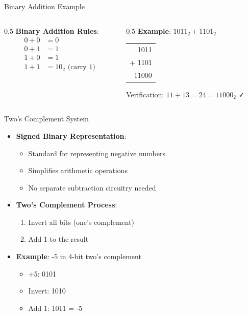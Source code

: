 \documentclass[aspectratio=169,11pt]{beamer}
\newcommand{\concept}[1]{\textbf{\color{accentcolor}#1}}
\begin{document}
\begin{frame}{Binary Addition Example}
\begin{columns}
\begin{column}{0.5\textwidth}
\concept{Binary Addition Rules}:
\begin{align}
0 + 0 &= 0\\
0 + 1 &= 1\\
1 + 0 &= 1\\
1 + 1 &= 10_2 \text{ (carry 1)}
\end{align}
\end{column}
\begin{column}{0.5\textwidth}
\concept{Example}: $1011_2 + 1101_2$
\begin{center}
\begin{tabular}{r}
  1011 \\
+ 1101 \\
\hline
 11000 \\
\end{tabular}
\end{center}
Verification: $11 + 13 = 24 = 11000_2$ ✓
\end{column}
\end{columns}
\end{frame}

\begin{frame}{Two's Complement System}
\begin{itemize}
\item \concept{Signed Binary Representation}:
\begin{itemize}
\item Standard for representing negative numbers
\item Simplifies arithmetic operations
\item No separate subtraction circuitry needed
\end{itemize}
\vspace{0.5cm}
\item \concept{Two's Complement Process}:
\begin{enumerate}
\item Invert all bits (one's complement)
\item Add 1 to the result
\end{enumerate}
\vspace{0.3cm}
\item \concept{Example}: -5 in 4-bit two's complement
\begin{itemize}
\item +5: 0101
\item Invert: 1010
\item Add 1: 1011 = -5
\end{itemize}
\end{itemize}
\end{frame}
\end{document}
